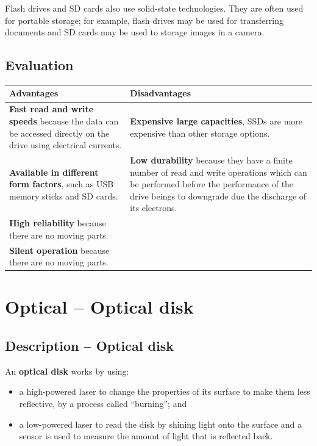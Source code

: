 \documentclass[a4paper]{systems-software}
\begin{document}
Flash drives and SD cards also use solid-state technologies. They are often used for portable storage; for example, flash drives may be used for transferring documents and SD cards may be used to storage images in a camera.


\subsection*{Evaluation}

\begin{longtabu} to \textwidth {| X[1,l] | X[1,l] |}
    \hline
    \textbf{Advantages} & \textbf{Disadvantages}
	\\ \hline
	\textbf{Fast read and write speeds} because the data can be accessed directly on the drive using electrical currents. & \textbf{Expensive large capacities}, SSDs are more expensive than other storage options.
	\\ \hline
	\textbf{Available in different form factors}, such as USB memory sticks and SD cards. & \textbf{Low durability} because they have a finite number of read and write operations which can be performed before the performance of the drive beings to downgrade due the discharge of its electrons.
	\\ \hline
	\textbf{High reliability} because there are no moving parts. &
	\\ \hline
	\textbf{Silent operation} because there are no moving parts. &
	\\ \hline
\end{longtabu}


\section*{Optical -- Optical disk}

\subsection*{Description -- Optical disk}

An \textbf{optical disk} works by using:
\begin{itemize}
	\item a high-powered laser to change the properties of its surface to make them less reflective, by a process called “burning”; and
	\item a low-powered laser to read the disk by shining light onto the surface and a sensor is used to measure the amount of light that is reflected back.
\end{itemize}
\end{document}
